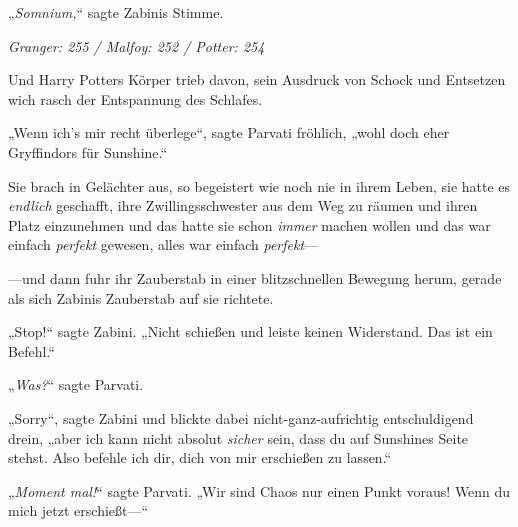 „\emph{Somnium,}“ sagte Zabinis Stimme.

\later

\emph{Granger: 255 / Malfoy: 252 / Potter: 254}

Und Harry Potters Körper trieb davon, sein Ausdruck von Schock und Entsetzen wich rasch der Entspannung des Schlafes.

„Wenn ich’s mir recht überlege“, sagte Parvati fröhlich, „wohl doch eher Gryffindors für Sunshine.“

Sie brach in Gelächter aus, so begeistert wie noch nie in ihrem Leben, sie hatte es \emph{endlich} geschafft, ihre Zwillingsschwester aus dem Weg zu räumen und ihren Platz einzunehmen und das hatte sie schon \emph{immer} machen wollen und das war einfach \emph{perfekt} gewesen, alles war einfach \emph{perfekt}—

—und dann fuhr ihr Zauberstab in einer blitzschnellen Bewegung herum, gerade als sich Zabinis Zauberstab auf sie richtete.

„Stop!“ sagte Zabini. „Nicht schießen und leiste keinen Widerstand. Das ist ein Befehl.“

„\emph{Was?}“ sagte Parvati.

„Sorry“, sagte Zabini und blickte dabei nicht-ganz-aufrichtig entschuldigend drein, „aber ich kann nicht absolut \emph{sicher} sein, dass du auf Sunshines Seite stehst. Also befehle ich dir, dich von mir erschießen zu lassen.“

„\emph{Moment mal!}“ sagte Parvati. „Wir sind Chaos nur einen Punkt voraus! Wenn du mich jetzt erschießt—“

